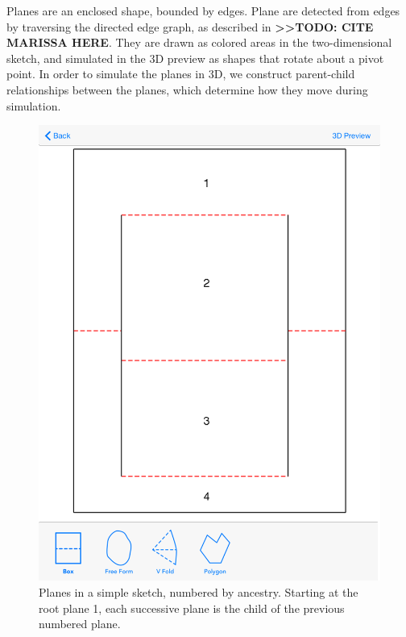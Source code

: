 Planes are an enclosed shape, bounded by edges. Plane are detected from
edges by traversing the directed edge graph, as described in
\textbf{\textgreater{}\textgreater{}TODO: CITE MARISSA HERE}. They are
drawn as colored areas in the two-dimensional sketch, and simulated in
the 3D preview as shapes that rotate about a pivot point. In order to
simulate the planes in 3D, we construct parent-child relationships
between the planes, which determine how they move during simulation.

\begin{figure}[htbp]
\centering
\includegraphics{figures/33_UI_Interface_Data_Structures/boxfold_planes.png}
\caption{Planes in a simple sketch, numbered by ancestry. Starting at
the root plane 1, each successive plane is the child of the previous
numbered plane.}
\end{figure}

